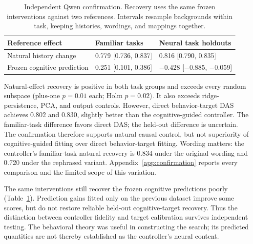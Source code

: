 \documentclass{article}
\begin{document}
\begin{table}[htbp]
\centering\small
\begin{tabular}{lll}
\toprule
Reference effect & Familiar tasks & Neural task holdouts \\
\midrule
Natural history change & 0.779 [0.736, 0.837] & 0.816 [0.790, 0.835] \\
Frozen cognitive prediction & 0.251 [0.101, 0.386] & $-0.428$ [$-0.885$, $-0.059$] \\
\bottomrule
\end{tabular}
\caption{Independent Qwen confirmation. Recovery uses the same frozen interventions against two references. Intervals resample backgrounds within task, keeping histories, wordings, and mappings together.}
\label{tab:confirmation}
\end{table}

Natural-effect recovery is positive in both task groups and exceeds every random subspace (plus-one $p=0.01$ each; Holm $p=0.02$). It also exceeds ridge-persistence, PCA, and output controls. However, direct behavior-target DAS achieves 0.802 and 0.830, slightly better than the cognitive-guided controller. The familiar-task difference favors direct DAS; the held-out difference is uncertain. The confirmation therefore supports natural causal control, but not superiority of cognitive-guided fitting over direct behavior-target fitting. Wording matters: the controller's familiar-task natural recovery is 0.834 under the original wording and 0.720 under the rephrased variant. Appendix~\ref{app:confirmation} reports every comparison and the limited scope of this variation.

The same interventions still recover the frozen cognitive predictions poorly (Table~\ref{tab:confirmation}). Prediction gains fitted only on the previous dataset improve some scores, but do not restore reliable held-out cognitive-target recovery. Thus the distinction between controller fidelity and target calibration survives independent testing. The behavioral theory was useful in constructing the search; its predicted quantities are not thereby established as the controller's neural content.
\end{document}
